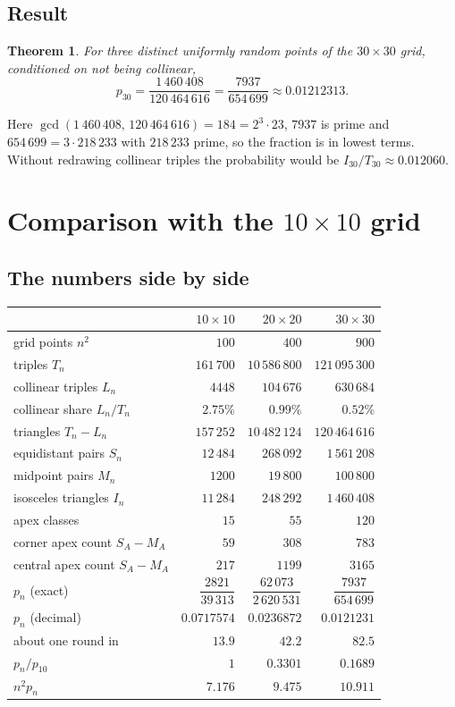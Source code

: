 \documentclass[11pt,a4paper]{article}
\newtheorem*{theorem*}{Theorem}
\theoremstyle{remark}
\begin{document}
\subsection{Result}
\begin{theorem*}
For three distinct uniformly random points of the $30\times30$ grid, conditioned
on not being collinear,
\[
  p_{30}=\frac{1\,460\,408}{120\,464\,616}=\frac{7937}{654\,699}\approx0.01212313 .
\]
\end{theorem*}
Here $\gcd(1\,460\,408,\,120\,464\,616)=184=2^3\cdot23$, $7937$ is prime and
$654\,699=3\cdot218\,233$ with $218\,233$ prime, so the fraction is in lowest
terms. Without redrawing collinear triples the probability would be
$I_{30}/T_{30}\approx0.012060$.

\section{Comparison with the $10\times10$ grid}

\subsection{The numbers side by side}

\begin{center}
\begin{tabular}{lrrr}
\toprule
 & $10\times10$ & $20\times20$ & $30\times30$ \\
\midrule
grid points $n^2$ & $100$ & $400$ & $900$ \\
triples $T_n$ & $161\,700$ & $10\,586\,800$ & $121\,095\,300$ \\
collinear triples $L_n$ & $4448$ & $104\,676$ & $630\,684$ \\
collinear share $L_n/T_n$ & $2.75\%$ & $0.99\%$ & $0.52\%$ \\
triangles $T_n-L_n$ & $157\,252$ & $10\,482\,124$ & $120\,464\,616$ \\
equidistant pairs $S_n$ & $12\,484$ & $268\,092$ & $1\,561\,208$ \\
midpoint pairs $M_n$ & $1200$ & $19\,800$ & $100\,800$ \\
isosceles triangles $I_n$ & $11\,284$ & $248\,292$ & $1\,460\,408$ \\
apex classes & $15$ & $55$ & $120$ \\
corner apex count $S_A-M_A$ & $59$ & $308$ & $783$ \\
central apex count $S_A-M_A$ & $217$ & $1199$ & $3165$ \\
\midrule
$p_n$ (exact) & $\dfrac{2821}{39\,313}$ & $\dfrac{62\,073}{2\,620\,531}$ &
  $\dfrac{7937}{654\,699}$ \\[2ex]
$p_n$ (decimal) & $0.0717574$ & $0.0236872$ & $0.0121231$ \\
about one round in & $13.9$ & $42.2$ & $82.5$ \\
$p_n/p_{10}$ & $1$ & $0.3301$ & $0.1689$ \\
$n^2 p_n$ & $7.176$ & $9.475$ & $10.911$ \\
\bottomrule
\end{tabular}
\end{center}
\end{document}
